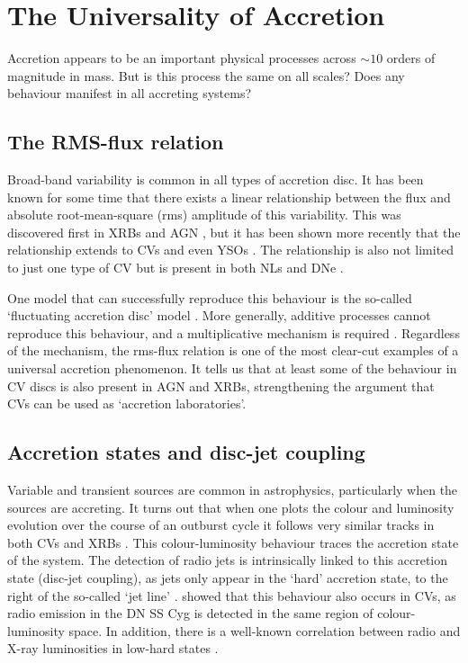 \section{The Universality of Accretion}

Accretion appears to be an important physical processes across $\sim10$ orders
of magnitude in mass. But is this process the same on all scales? Does any 
behaviour manifest in all accreting systems? 

\subsection{The RMS-flux relation}
Broad-band variability is common in all types of accretion disc. It has been
known for some time that there exists a linear relationship
between the flux and absolute root-mean-square (rms) amplitude
of this variability. This was discovered first in XRBs and AGN 
\citep{uttley2001, uttley2005, heil2012}, but it has been shown
more recently that the relationship extends to CVs and even YSOs 
\citep{scaringi2012,scaringi2015a}. The relationship is also not limited
to just one type of CV but is present in both NLs and DNe \citep{vandesande2015}.
 
One model that can successfully reproduce this behaviour is the so-called
`fluctuating accretion disc' model \citep{lyubarskii1997,kotov2001,
arevalo2006,hogg2015}. More generally,
additive processes cannot reproduce this behaviour, and a multiplicative
mechanism is required \citep{uttley2005}. 
Regardless of the mechanism, the rms-flux relation is one of the most
clear-cut examples of a universal accretion phenomenon. 
It tells us that at least some of the behaviour in CV discs
is also present in AGN and XRBs, strengthening the argument that CVs
can be used as `accretion laboratories'. 

\subsection{Accretion states and disc-jet coupling}
\label{sec:disc-jet}

Variable and transient sources are common in astrophysics, particularly
when the sources are accreting. It turns out that when one plots
the colour and luminosity evolution over the course of an outburst cycle 
it follows very similar tracks in both CVs and XRBs
\citep[see Fig.~\ref{fig:kording_hid}, ][]{kordingDNjet2008}.
This colour-luminosity behaviour traces the accretion state of the system. 
The detection of radio jets is intrinsically linked to this accretion state
(disc-jet coupling), as jets only appear in the `hard' accretion 
state, to the right of the so-called `jet line' \citep{fender2001,fender2004}.
\cite{kordingDNjet2008} showed that this behaviour also occurs in CVs, 
as radio emission in the DN SS Cyg is detected in the same region 
of colour-luminosity space. In addition, there is a well-known correlation between 
radio and X-ray luminosities in low-hard states \citep{gallo2003}.

